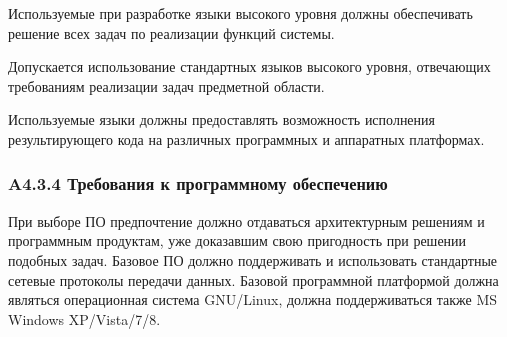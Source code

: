 Используемые при разработке языки высокого уровня должны обеспечивать решение
всех задач по реализации функций системы.

Допускается использование стандартных языков высокого уровня, отвечающих
требованиям реализации задач предметной области.

Используемые языки должны предоставлять возможность исполнения результирующего
кода на различных программных и аппаратных платформах.

\subsubsection*{A4.3.4 Требования к программному обеспечению}

При выборе ПО предпочтение должно отдаваться архитектурным решениям и
программным продуктам, уже доказавшим свою пригодность при решении подобных
задач. Базовое ПО должно поддерживать и использовать стандартные сетевые
протоколы передачи данных. Базовой программной платформой должна являться
операционная система GNU/Linux, должна поддерживаться также MS Windows XP/Vista/7/8.
